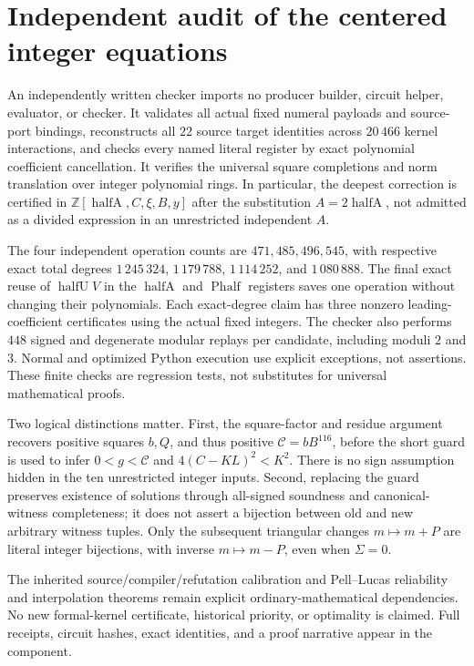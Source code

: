 \documentclass[11pt]{article}
\begin{document}
\section{Independent audit of the centered integer equations}
An independently written checker imports no producer builder, circuit helper,
evaluator, or checker. It validates all actual fixed numeral payloads and
source-port bindings, reconstructs all $22$ source target identities across
$20\,466$ kernel interactions, and checks every named literal register by
exact polynomial coefficient cancellation. It verifies the universal square
completions and norm translation over integer polynomial rings. In particular,
the deepest correction is certified in
$\mathbb Z[\operatorname{halfA},C,\xi,B,y]$ after the substitution
$A=2\operatorname{halfA}$, not admitted as a divided expression in an
unrestricted independent $A$.

The four independent operation counts are $471,485,496,545$, with respective
exact total degrees $1\,245\,324$, $1\,179\,788$, $1\,114\,252$, and
$1\,080\,888$. The final exact reuse of $\operatorname{halfU}V$ in the $\operatorname{halfA}$ and $\operatorname{Phalf}$ registers saves one operation without changing their polynomials. Each exact-degree claim has three nonzero leading-coefficient
certificates using the actual fixed integers. The checker also performs
$448$ signed and degenerate modular replays per candidate, including moduli
$2$ and $3$. Normal and optimized Python execution use explicit exceptions,
not assertions. These finite checks are regression tests, not substitutes for
universal mathematical proofs.

Two logical distinctions matter. First, the square-factor and residue
argument recovers positive squares $b,Q$, and thus positive
$\mathcal C=bB^{116}$, before the short guard is used to infer
$0<g<\mathcal C$ and $4(C-KL)^2<K^2$. There is no sign assumption hidden in the
ten unrestricted integer inputs. Second, replacing the guard preserves
existence of solutions through all-signed soundness and canonical-witness
completeness; it does not assert a bijection between old and new arbitrary
witness tuples. Only the subsequent triangular changes
$m\mapsto m+P$ are literal integer bijections, with inverse $m\mapsto m-P$,
even when $\Sigma=0$.

The inherited source/compiler/refutation calibration and Pell--Lucas
reliability and interpolation theorems remain explicit ordinary-mathematical
dependencies. No new formal-kernel certificate, historical priority, or
optimality is claimed. Full receipts, circuit hashes, exact identities, and
a proof narrative appear in the  component.
\end{document}
